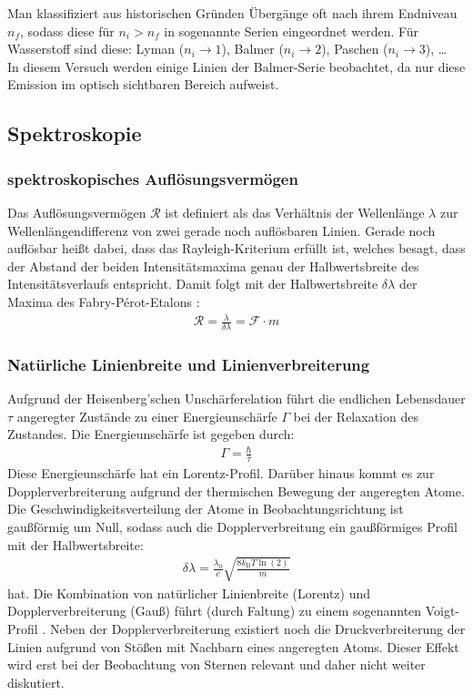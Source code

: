 \documentclass[11pt, a4paper]{article}
\numberwithin{equation}{section}
\begin{document}
Man klassifiziert aus historischen Gründen Übergänge oft nach ihrem Endniveau $n_f$, sodass diese für $n_i > n_f$ in sogenannte Serien eingeordnet werden.
Für Wasserstoff sind diese: Lyman ($n_i \rightarrow 1$), Balmer ($n_i \rightarrow 2$), Paschen ($n_i \rightarrow 3$), \dots\\
In diesem Versuch werden einige Linien der Balmer-Serie beobachtet, da nur diese Emission im optisch sichtbaren Bereich aufweist.

\subsection{Spektroskopie}
\subsubsection{spektroskopisches Auflösungsvermögen}
Das Auflösungsvermögen $\mathcal{R}$ ist definiert als das Verhältnis der Wellenlänge $\lambda$ zur Wellenlängendifferenz von zwei gerade noch auflösbaren Linien.
Gerade noch auflösbar heißt dabei, dass das Rayleigh-Kriterium erfüllt ist, welches besagt, dass der Abstand der beiden Intensitätsmaxima genau der Halbwertsbreite des Intensitätsverlaufs entspricht.
Damit folgt mit der Halbwertsbreite $\delta \lambda$ der Maxima des Fabry-Pérot-Etalons \cite{hecht}:
\begin{align}
\mathcal{R} = \frac{\lambda}{\delta \lambda} = \mathcal{F} \cdot m
\label{eq:aufloesung}
\end{align}

\subsubsection{Natürliche Linienbreite und Linienverbreiterung}
Aufgrund der Heisenberg'schen Unschärferelation führt die endlichen Lebensdauer $\tau$ angeregter Zustände zu einer Energieunschärfe $\Gamma$ bei der Relaxation des Zustandes.
Die Energieunschärfe ist gegeben durch:
\begin{align*}
\Gamma = \frac{\hbar}{\tau}
\end{align*}
Diese Energieunschärfe hat ein Lorentz-Profil.
Darüber hinaus kommt es zur Dopplerverbreiterung aufgrund der thermischen Bewegung der angeregten Atome.
Die Geschwindigkeitsverteilung der Atome in Beobachtungsrichtung ist gaußförmig um Null, sodass auch die Dopplerverbreitung ein gaußförmiges Profil mit der Halbwertsbreite:
\begin{align}
\delta \lambda = \frac{\lambda_0}{c} \sqrt{\frac{8 k_\mathrm{B} T \ln(2)}{m}}
\label{eq:doppler}
\end{align}
hat.
Die Kombination von natürlicher Linienbreite (Lorentz) und Dopplerverbreiterung (Gauß) führt (durch Faltung) zu einem sogenannten Voigt-Profil \cite{siegmann}.
Neben der Dopplerverbreiterung existiert noch die Druckverbreiterung der Linien aufgrund von Stößen mit Nachbarn eines angeregten Atoms.
Dieser Effekt wird erst bei der Beobachtung von Sternen relevant und daher nicht weiter diskutiert.
\end{document}
